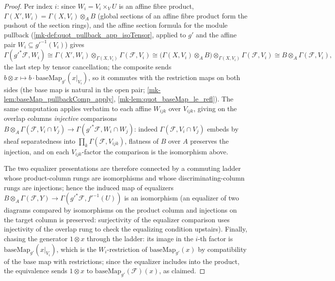 \begin{proof}
  Per index \(i\): since \(W_i = V_i \times_V U\) is an affine fibre
  product, \(\Gamma(X', W_i) = \Gamma(X, V_i) \otimes_A B\) (global sections
  of an affine fibre product form the pushout of the section rings), and the
  affine section formula for the module pullback
  (\ref{mk-def:quot_pullback_app_isoTensor}, applied to \(g'\) and the affine
  pair \(W_i \subseteq g'^{-1}(V_i)\)) gives
  \[
    \Gamma(g'^*\mathcal F, W_i)
    \cong \Gamma(X', W_i) \otimes_{\Gamma(X, V_i)} \Gamma(\mathcal F, V_i)
    \cong \bigl(\Gamma(X, V_i) \otimes_A B\bigr)
      \otimes_{\Gamma(X, V_i)} \Gamma(\mathcal F, V_i)
    \cong B \otimes_A \Gamma(\mathcal F, V_i),
  \]
  the last step by tensor cancellation; the composite sends
  \(b \otimes x \mapsto b \cdot \mathrm{baseMap}_{g'}(x|_{V_i})\), so it
  commutes with the restriction maps on both sides (the base map is
  natural in the open pair; \ref{mk-lem:baseMap_pullbackComp_apply},
  \ref{mk-lem:quot_baseMap_le_refl}). The same computation applies verbatim
  to each affine \(W_{ijk}\) over \(V_{ijk}\), giving on the overlap
  columns \emph{injective} comparisons
  \(B \otimes_A \Gamma(\mathcal F, V_i \cap V_j) \to
    \Gamma(g'^*\mathcal F, W_i \cap W_j)\):
  indeed \(\Gamma(\mathcal F, V_i \cap V_j)\) embeds by sheaf separatedness
  into \(\prod_k \Gamma(\mathcal F, V_{ijk})\), flatness of \(B\) over \(A\)
  preserves the injection, and on each \(V_{ijk}\)-factor the comparison is
  the isomorphism above.

  The two equalizer presentations are therefore connected by a commuting
  ladder whose product-column rungs are isomorphisms and whose
  discriminating-column rungs are injections; hence the induced map of
  equalizers
  \(B \otimes_A \Gamma(\mathcal F, Y) \to
    \Gamma(g'^*\mathcal F, f'^{-1}(U))\)
  is an isomorphism (an equalizer of two diagrams compared by isomorphisms
  on the product column and injections on the target column is preserved:
  surjectivity of the equalizer comparison uses injectivity of the overlap
  rung to check the equalizing condition upstairs). Finally, chasing the
  generator \(1 \otimes x\) through the ladder: its image in the \(i\)-th
  factor is \(\mathrm{baseMap}_{g'}(x|_{V_i})\), which is the
  \(W_i\)-restriction of \(\mathrm{baseMap}_{g'}(x)\) by compatibility of
  the base map with restrictions; since the equalizer includes into the
  product, the equivalence sends \(1 \otimes x\) to
  \(\mathrm{baseMap}_{g'}(\mathcal F)(x)\), as claimed.
\end{proof}

